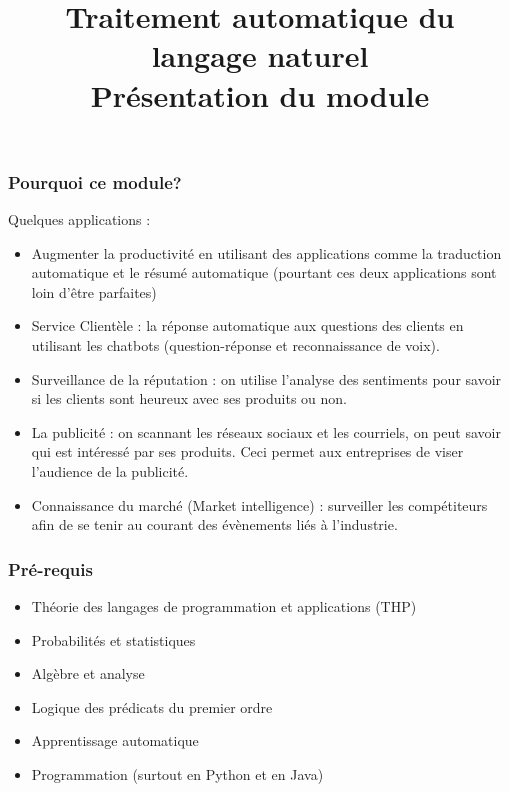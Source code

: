 \documentclass{beamer}
\title[TALN : Présentation] %
{Traitement automatique du langage naturel\\Présentation du module}
\begin{document}
\begin{frame}
\frametitle{Pourquoi ce module?}

Quelques applications :
\begin{itemize}
	\item Augmenter la productivité en utilisant des applications comme la traduction automatique et le résumé automatique (pourtant ces deux applications sont loin d'être parfaites)

	\item Service Clientèle : la réponse automatique aux questions des clients en utilisant les chatbots (question-réponse et reconnaissance de voix). 

	\item Surveillance de la réputation : on utilise l'analyse des sentiments pour savoir si les clients sont heureux avec ses produits ou non. 

	\item La publicité : on scannant les réseaux sociaux et les courriels, on peut savoir qui est intéressé par ses produits. Ceci permet aux entreprises de viser l'audience de la publicité. 

	\item Connaissance du marché (Market intelligence) : surveiller les compétiteurs afin de se tenir au courant des évènements liés à l'industrie.
\end{itemize}

\end{frame}


\begin{frame}
\frametitle{Pré-requis}

\begin{itemize}
	\item Théorie des langages de programmation et applications (THP)
	\item Probabilités et statistiques
	\item Algèbre et analyse 
	\item Logique des prédicats du premier ordre
	\item Apprentissage automatique 
	\item Programmation (surtout en Python et en Java)
\end{itemize}

\end{frame}
\end{document}
